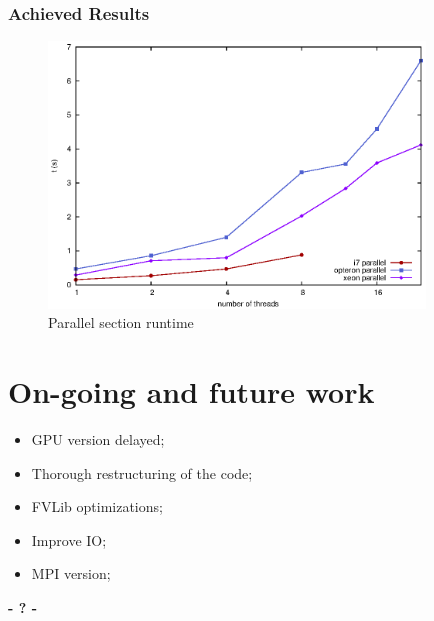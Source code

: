 \documentclass{beamer}
\begin{document}
\begin{frame}
	\frametitle{Achieved Results}
	\begin{center}

	\begin{figure}[!htp]
		\includegraphics[width=10cm]{images/parallel.eps}
		\caption{Parallel section runtime}
		\label{fig:roofline}
	\end{figure}
	\end{center}
\end{frame}


\section{On-going and future work}
\begin{frame}
	\begin{center}
	\begin{itemize}
		\item GPU version delayed;
		\item Thorough restructuring of the code;
		\item FVLib optimizations;
		\item Improve IO;
		\item MPI version;
	\end{itemize}
	\end{center}
\end{frame}

\begin{frame}
\titlepage
	\begin{center}
		\Huge\bfseries
		- ? -
	\end{center}
\end{frame}
\end{document}
